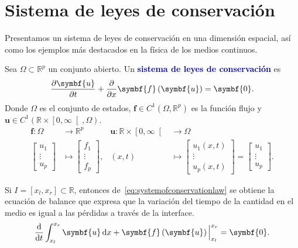 \chapter{Sistema de leyes de conservación}

Presentamos un sistema de leyes de conservación en una dimensión
espacial, así como los ejemplos más destacados en la física de los
medios continuos.

\begin{definition}
	Sea $\Omega\subset\mathbb{R}^{p}$ un conjunto abierto.
	Un \textcolor{DarkBlue}{\bfseries sistema de leyes de conservación}
	es
	\begin{equation}\label{eq:systemofconservationlaw}
		\diffp{\symbf{u}}{t}+
		\diffp{}{x}
		\symbf{f}\left(\symbf{u}\right)=
		\symbf{0}.
	\end{equation}
	Donde $\Omega$ es el conjunto de estados,
	$\symbf{f}\in C^{1}\left(\Omega,\mathbb{R}^{p}\right)$ es la
	función flujo y $\symbf{u}\in C^{1}\left(\mathbb{R}\times\left[0,\infty\right[,\Omega\right)$.
	\begin{align*}
		\symbf{f}\colon\Omega
		                & \longrightarrow\mathbb{R}^{p} &
		\symbf{u}\colon\mathbb{R}\times\left[0,\infty\right[
		                & \longrightarrow\Omega           \\
		\begin{bmatrix}
			u_{1}  \\
			\vdots \\
			u_{p}
		\end{bmatrix}
		                & \longmapsto
		\begin{bmatrix}
			f_{1}  \\
			\vdots \\
			f_{p}
		\end{bmatrix}, &
		\left(x,t\right)
		                & \longmapsto
		\begin{bmatrix}
			u_{1}\left(x,t\right) \\
			\vdots                \\
			u_{p}\left(x,t\right)
		\end{bmatrix}=
		\begin{bmatrix}
			u_{1}  \\
			\vdots \\
			u_{p}
		\end{bmatrix}.
	\end{align*}
\end{definition}
Si $I=\left[x_{l},x_{r}\right]\subset\mathbb{R}$, entonces
de~\eqref{eq:systemofconservationlaw} se obtiene la ecuación de
balance que expresa que la variación del tiempo de la cantidad en el
medio es igual a las pérdidas a través de la interface.
\begin{equation*}
	\diff{}{t}
	\int^{x_{r}}_{x_{l}}\symbf{u}\dl x+
	\symbf{f}\left(\symbf{u}\right)\Big|^{x_{r}}_{x_{l}}=
	\symbf{0}.
\end{equation*}

